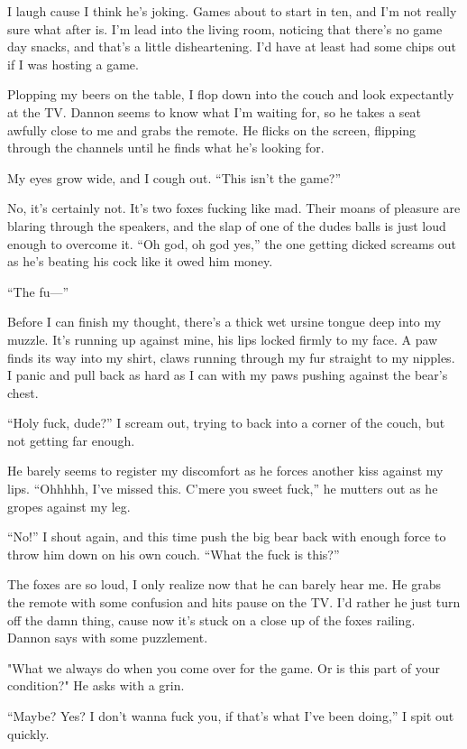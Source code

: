 I laugh cause I think he's joking. Games about to start in ten, and I'm
not really sure what after is. I'm lead into the living room, noticing
that there's no game day snacks, and that's a little disheartening. I'd
have at least had some chips out if I was hosting a game.

Plopping my beers on the table, I flop down into the couch and look
expectantly at the TV. Dannon seems to know what I'm waiting for, so he
takes a seat awfully close to me and grabs the remote. He flicks on the
screen, flipping through the channels until he finds what he's looking
for.

My eyes grow wide, and I cough out. ``This isn't the game?''

No, it's certainly not. It's two foxes fucking like mad. Their moans of
pleasure are blaring through the speakers, and the slap of one of the
dudes balls is just loud enough to overcome it. ``Oh god, oh god yes,''
the one getting dicked screams out as he's beating his cock like it owed
him money.

``The fu---''

Before I can finish my thought, there's a thick wet ursine tongue deep
into my muzzle. It's running up against mine, his lips locked firmly to
my face. A paw finds its way into my shirt, claws running through my fur
straight to my nipples. I panic and pull back as hard as I can with my
paws pushing against the bear's chest.

``Holy fuck, dude?'' I scream out, trying to back into a corner of the
couch, but not getting far enough.

He barely seems to register my discomfort as he forces another kiss
against my lips. ``Ohhhhh, I've missed this. C'mere you sweet fuck,'' he
mutters out as he gropes against my leg.

``No!'' I shout again, and this time push the big bear back with enough
force to throw him down on his own couch. ``What the fuck is this?''

The foxes are so loud, I only realize now that he can barely hear me. He
grabs the remote with some confusion and hits pause on the TV. I'd
rather he just turn off the damn thing, cause now it's stuck on a close
up of the foxes railing. Dannon says with some puzzlement.

"What we always do when you come over for the game. Or is this part of
your condition?" He asks with a grin.

``Maybe? Yes? I don't wanna fuck you, if that's what I've been doing,'' I
spit out quickly.

